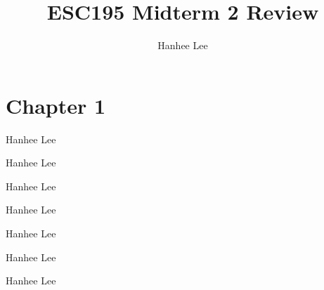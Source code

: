 \documentclass{article}
\title{ESC195 Midterm 2 Review}
\author{Hanhee Lee}
\begin{document}
    \maketitle
    \tableofcontents
    \section{Chapter 1}

\begin{process}
    Hanhee Lee
\end{process}

\begin{example}
    Hanhee Lee
\end{example}

\begin{definition}
    Hanhee Lee 
\end{definition}

\begin{theorem}
    Hanhee Lee
\end{theorem}

\begin{derivation}
    Hanhee Lee
\end{derivation}

\begin{intuition}
    Hanhee Lee
\end{intuition}

\begin{warning}
    Hanhee Lee
\end{warning}
\end{document}
